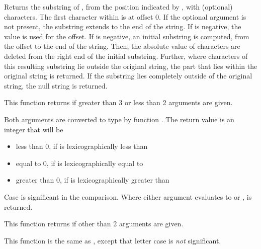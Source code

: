 \begin{description}
  \item[\Code{String substr(String s, Integer offset \Lbr\ , Integer length  \Rbr)}]
    Returns the substring of , from the position indicated by ,
    with (optional)  characters.
    The first character within  is at offset 0.
    If the optional  argument is not present, the substring extends to the
    end of the string.
    If  is negative, the value  is used for the offset.
    If  is negative, an initial substring is computed, from the offset
    to the end of the string.
    Then, the absolute value of  characters are deleted from the
    right end of the initial substring.
    Further, where characters of this resulting substring lie outside the original
    string, the part that lies within the original string is returned.
    If the substring lies completely outside of the original string, the null string
    is returned.

    This function returns  if greater than 3 or less than 2
    arguments are given.
    
  \item[\Code{Integer strcmp(AnyType Expr1, AnyType Expr2)}]
    Both arguments are converted to type  by function .
    The return value is an integer that will be
    \begin{itemize}
      \item{less than 0},
      if  is lexicographically less than 
      \item{equal to 0},
      if  is lexicographically equal to 
      \item{greater than 0},
      if  is lexicographically greater than 
    \end{itemize}
    Case is significant in the comparison.
    Where either argument evaluates to  or ,
     is returned.

    This function returns  if other than 2 arguments are given.

  \item[\Code{Integer stricmp(AnyType Expr1, AnyType Expr2)}]
    This function is the same as , except that letter case is
    \emph{not} significant.


\end{description}
